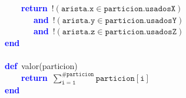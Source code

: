 \mbox{}\ \ \ \ \textbf{\textcolor{Blue}{return}}\ $\mathtt{!(arista.x \in particion.usadosX)}$ \\ %
\mbox{}\ \ \ \ \ \ \ \textbf{\textcolor{Blue}{and}}\ $\mathtt{!(arista.y \in particion.usadosY)}$ \\
\mbox{}\ \ \ \ \ \ \ \textbf{\textcolor{Blue}{and}}\ $\mathtt{!(arista.z \in particion.usadosZ)}$ \\
\mbox{}\textbf{\textcolor{Blue}{end}} \\
\mbox{} \\
\mbox{}\textbf{\textcolor{Blue}{def}}\ valor\textcolor{BrickRed}{(}particion\textcolor{BrickRed}{)} \\
\mbox{}\ \ \ \ \textbf{\textcolor{Blue}{return}}\ $\sum_{\mathtt{i=1}}^{\mathtt{\#particion}} \mathtt{particion[i]} $ \\
\mbox{}\textbf{\textcolor{Blue}{end}} \\
\mbox{}
